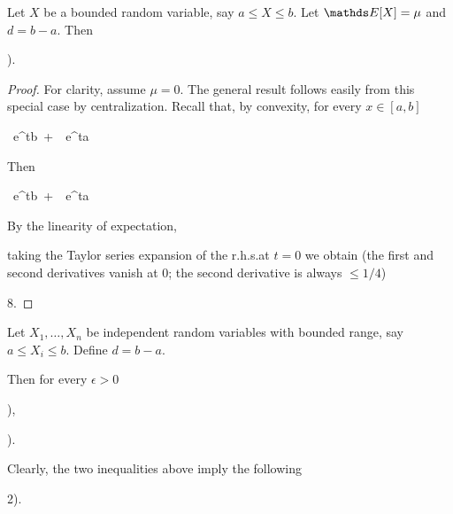 \documentclass[scombinatorics.tex]{subfiles}
\begin{document}
  \begin{void_thm}\label{lem_Hoeffding}
    Let $X$ be a bounded random variable, say $a\le X\le b$. 
    Let $\Ex[X]=\mu$ and $d=b-a$.
    Then
    
    \ceq{\hfill\Ex\Big[e^{t(X-\mu)}\Big]}
    {\le}
    {\Big).}\smallskip
  \end{void_thm}

\begin{proof}
  For clarity, assume $\mu=0$.
  The general result follows easily from this special case by centralization.
  Recall that, by convexity, for every $x\in[a,b]$

  {\le}
  {\ e^{tb}\ +\ \ e^{ta}}

  Then

  {\le}
  {\ e^{tb}\ +\ \ e^{ta}}

  By the linearity of expectation,

  \ceq{\hfill\Ex\Big[e^{tX}\Big]}
  {\le}
  {}

  \ceq{\hfill\log\Ex\Big[e^{tX}\Big]}
  {\le}
  {\log{}}

taking the Taylor series expansion of the r.h.s.\@ at $t=0$ we obtain (the first and second derivatives vanish at $0$; the second derivative is always $\le 1/4$)

\ceq{\hfill\log\Ex\Big[e^{tX}\Big]}
    {\le}
    {8.}
\end{proof}

\begin{void_thm}\label{Chebyshev}
  Let $X_1,\dots,X_n$ be independent random variables with bounded range, say $a\le X_i\le b$. Define $d=b-a$.
  
  
  Then for every $\epsilon>0$ 

      {\le}
      {\Big),}

      {\le}
      {\Big).}\smallskip
\end{void_thm}

Clearly, the two inequalities above imply the following

    {\le}
    {2\Big).}\smallskip
\end{document}
